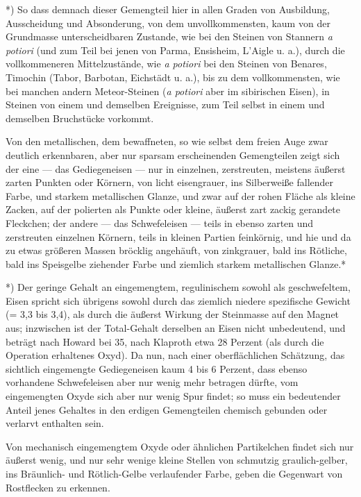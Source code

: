 \documentclass[a4paper, 11pt, oneside, german]{article}
\begin{document}
*) So dass demnach dieser Gemengteil hier in allen Graden von Ausbildung, Ausscheidung und Absonderung, von dem unvollkommensten, kaum von der Grundmasse unterscheidbaren Zustande, wie bei den Steinen von Stannern \emph{a potiori} (und zum Teil bei jenen von Parma, Ensisheim, L'Aigle u. a.), durch die vollkommeneren Mittelzustände, wie \emph{a potiori} bei den Steinen von Benares, Timochin (Tabor, Barbotan, Eichstädt u. a.), bis zu dem vollkommensten, wie bei manchen andern Meteor-Steinen (\emph{a potiori} aber im sibirischen Eisen), in Steinen von einem und demselben Ereignisse, zum Teil selbst in einem und demselben Bruchstücke vorkommt.

Von den metallischen, dem bewaffneten, so wie selbst dem freien Auge zwar deutlich erkennbaren, aber nur sparsam erscheinenden Gemengteilen zeigt sich der eine --- das Gediegeneisen --- nur in einzelnen, zerstreuten, meistens äußerst zarten Punkten oder Körnern, von licht eisengrauer, ins Silberweiße fallender Farbe, und starkem metallischen Glanze, und zwar auf der rohen Fläche als kleine Zacken, auf der polierten als Punkte oder kleine, äußerst zart zackig gerandete Fleckchen; der andere --- das Schwefeleisen --- teils in ebenso zarten und zerstreuten einzelnen Körnern, teils in kleinen Partien feinkörnig, und hie und da zu etwas größeren Massen bröcklig angehäuft, von zinkgrauer, bald ins Rötliche, bald ins Speisgelbe ziehender Farbe und ziemlich starkem metallischen Glanze.*

*) Der geringe Gehalt an eingemengtem, regulinischem sowohl als geschwefeltem, Eisen spricht sich übrigens sowohl durch das ziemlich niedere spezifische Gewicht (= 3,3 bis 3,4), als durch die äußerst Wirkung der Steinmasse auf den Magnet aus; inzwischen ist der Total-Gehalt derselben an Eisen nicht unbedeutend, und beträgt nach Howard bei 35, nach Klaproth etwa 28 Perzent (als durch die Operation erhaltenes Oxyd). Da nun, nach einer oberflächlichen Schätzung, das sichtlich eingemengte Gediegeneisen kaum 4 bis 6 Perzent, dass ebenso vorhandene Schwefeleisen aber nur wenig mehr betragen dürfte, vom eingemengten Oxyde sich aber nur wenig Spur findet; so muss ein bedeutender Anteil jenes Gehaltes in den erdigen Gemengteilen chemisch gebunden oder verlarvt enthalten sein.

Von mechanisch eingemengtem Oxyde oder ähnlichen Partikelchen findet sich nur äußerst wenig, und nur sehr wenige kleine Stellen von schmutzig graulich-gelber, ins Bräunlich- und Rötlich-Gelbe verlaufender Farbe, geben die Gegenwart von Rostflecken zu erkennen.
\end{document}
